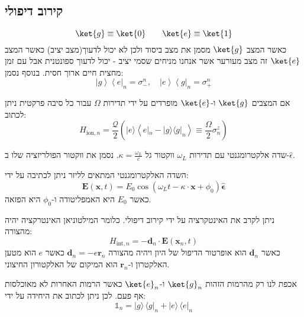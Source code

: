 \documentclass{tstextbook}
\begin{document}
\subsection{קירוב דיפולי}

\begin{symbolize}
$$\ket{g} \equiv \ket{0} \qquad \ket{e} \equiv \ket{1} $$
כאשר המצב \(\ket{g}\) מסמן את מצב ביסוד ולכן לא יכול לדעוך(מצב יציב) כאשר המצב \(\ket{e}\) זה מצב מעורער אשר אנחנו מניחים שסמי יציב - יכול לדעוך ספונטנית אבל עם זמן מחצית חיים ארוך חסית. בנוסף נסמן:
$$\left|g\right\rangle\left\langle e\right|_{n}=\sigma_{-}^{n},\quad\left|e\right\rangle\left\langle g\right|_{n}=\sigma_{+}^{n}$$

\end{symbolize}
\begin{proposition}
אם המצבים \(\ket{g}\) ו-\(\ket{e}\) מופרדים על ידי תדירות \(\Omega\) עבור כל סיבה פרקטית ניתן לכתוב:
$$H_{\mathrm{ion,}n}=\frac{\mathcal{Q}}{2}\left(|e\rangle\left\langle e|_{n}-|g\rangle\langle g|_{n}\right\rangle\equiv\frac{\Omega}{2}\sigma_{n}^{z}\right)$$

\end{proposition}
\begin{definition}[לייזר]
שדה אלקטרומגנטי עם תדירות \(\omega_{L}\) ווקטור גל \(\kappa=\frac{\omega_{L}}{c}\). נסמן את ווקטור הפולריזציה שלו ב-\(\hat{\epsilon}\).

\end{definition}
\begin{corollary}
השדה האלקטרומגנטי המתאים לליזר ניתן לכתיבה על ידי:
$$\mathbf{E}\left(\mathbf{x},t\right)=E_{0}\cos\left(\omega_{L}t-\kappa\cdot\mathbf{x}+\phi_{0}\right){\hat{\mathbf{\epsilon}}}$$
כאשר \(E_{0}\) היא האמפליטודה ו-\(\phi_{0}\) היא הפזאה. 

\end{corollary}
\begin{proposition}
ניתן לקרב את האינטקרציה על ידי קירוב דיפולי. כלומר המילטוניאן האינטרקציה יהיה מהצורה:
$$H_{\mathrm{int},n}=-\mathbf{d}_{n}\cdot\mathbf{E}\left(\mathbf{x}_{n},t\right)$$
כאשר \(\mathbf{d}_{n}\) הוא אופרטור הדיפול של היון ויהיה מהצורה \(\mathbf{d}_{n}=-e\mathbf{r}_{n}\) כאשר \(e\) הוא מטען האלקטרון ו-\(\mathbf{r}_{n}\) הוא המיקום של האלקטורון החיצוני.

\end{proposition}
\begin{proposition}
אכפת לנו רק מהרמות הזהות \(\ket{g}_{n}\) ו-\(\ket{e}_{n}\) כאשר הרמות האחרות לא מאוכלסות אף פעם. לכן ניתן לכתוב את היחידה על ידי:
$$\mathbb{1}_{n}=|g\rangle\,\langle g|_{n}+|e\rangle\,\langle e|_{n}$$

\end{proposition}
\end{document}
